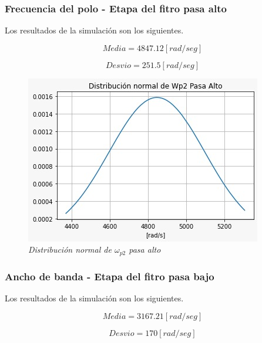 \documentclass[12pt,A4paper,titlepage]{article}
\begin{document}
\subsubsection{Frecuencia del polo - Etapa del fitro pasa alto}
\hspace{1mm} Los resultados de la simulación son los siguientes.

\begin{equation}
    \boxed{Media = 4847.12 [rad/seg]}     
\end{equation}

\begin{equation}
    \boxed{Desvio = 251.5 [rad/seg]}
\end{equation}

\begin{figure}[!h] 
  \centering
  \includegraphics[scale=0.7]{Imagenes/Distribución normal de Wp2 pasa alto.png}
  \caption{\textit{Distribución normal de \(\omega_{p2}\) pasa alto}}
\end{figure}

\newpage
\subsubsection{Ancho de banda - Etapa del fitro pasa bajo}
\hspace{1mm} Los resultados de la simulación son los siguientes.

\begin{equation}
    \boxed{Media = 3167.21 [rad/seg] }    
\end{equation}

\begin{equation}
    \boxed{Desvio = 170 [rad/seg]}
\end{equation}
\end{document}
